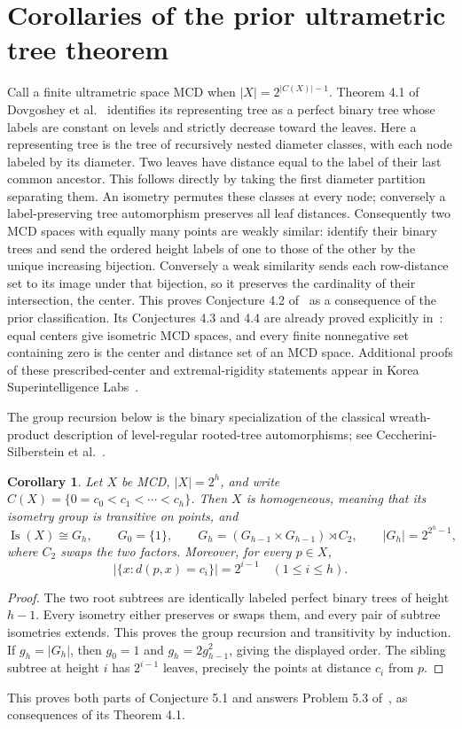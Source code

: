 \documentclass[11pt]{article}
\newtheorem{corollary}[theorem]{Corollary}
\begin{document}
\section{Corollaries of the prior ultrametric tree theorem}\label{sec:trees}
Call a finite ultrametric space MCD when
$|X|=2^{|C(X)|-1}$. Theorem 4.1 of Dovgoshey et al.~\cite{BT}
identifies its representing tree as a perfect binary tree whose
labels are constant on levels and strictly decrease toward the leaves.
Here a representing tree is the tree of recursively nested diameter
classes, with each node labeled by its diameter. Two leaves have
distance equal to the label of their last common ancestor. This
follows directly by taking the first diameter partition separating them.
An isometry permutes these classes at every node; conversely a
label-preserving tree automorphism preserves all leaf distances.
Consequently two MCD spaces with equally many points are weakly similar:
identify their binary trees and send the ordered height labels of one
to those of the other by the unique increasing bijection.
Conversely a weak similarity sends each row-distance set to its
image under that bijection, so it preserves the cardinality of their
intersection, the center.
This proves Conjecture 4.2 of~\cite[p.~20]{UM} as a consequence of
the prior classification. Its Conjectures 4.3 and 4.4 are already
proved explicitly in~\cite[Corollaries 4.3 and 4.6]{BT}:
equal centers give isometric MCD spaces, and every finite nonnegative
set containing zero is the center and distance set of an MCD space.
Additional proofs of these prescribed-center and extremal-rigidity statements
appear in Korea Superintelligence Labs~\cite[Theorem 6.1, Proposition 7.4
and Corollary 7.5]{KSI}.

The group recursion below is the binary specialization of the classical
wreath-product description of level-regular rooted-tree automorphisms;
see Ceccherini-Silberstein et al.~\cite[Sections 2.8 and 3.1, pp.~11--12]{G}.

\begin{corollary}\label{cor:binary}
Let $X$ be MCD, $|X|=2^h$, and write
$C(X)=\{0=c_0<c_1<\cdots<c_h\}$. Then $X$ is homogeneous,
meaning that its isometry group is transitive on points, and
\[
 \operatorname{Is}(X)\cong G_h,\qquad
 G_0=\{1\},\qquad
 G_h=(G_{h-1}\times G_{h-1})\rtimes C_2,
 \qquad |G_h|=2^{2^h-1},
\]
where $C_2$ swaps the two factors. Moreover, for every $p\in X$,
\[
 |\{x:d(p,x)=c_i\}|=2^{i-1}\quad(1\le i\le h).
\]
\end{corollary}
\begin{proof}
The two root subtrees are identically labeled perfect binary trees
of height $h-1$. Every isometry either preserves or swaps them,
and every pair of subtree isometries extends. This proves the group
recursion and transitivity by induction. If $g_h=|G_h|$, then
$g_0=1$ and $g_h=2g_{h-1}^2$, giving the displayed order.
The sibling subtree at height $i$ has $2^{i-1}$ leaves, precisely
the points at distance $c_i$ from $p$.
\end{proof}
This proves both parts of Conjecture 5.1 and answers Problem 5.3
of~\cite[Section 5, pp.~26--27]{BT}, as consequences of its Theorem 4.1.
\end{document}
